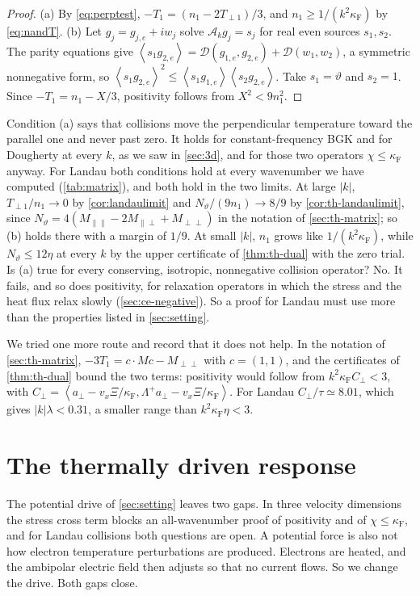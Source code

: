 \documentclass[11pt]{article}
\newcommand{\av}[1]{\left\langle #1\right\rangle}
\newcommand{\D}{\mathcal D}
\newcommand{\A}{\mathcal A}
\newcommand{\F}{\kappa_{\mathrm F}}
\newcommand{\dual}[1]{\left\langle #1,\Lambda^+ #1\right\rangle}
\theoremstyle{definition}
\theoremstyle{remark}
\numberwithin{equation}{section}
\begin{document}
\begin{proof}
(a) By \eqref{eq:perptest}, $-T_1=(n_1-2T_{\perp1})/3$, and
$n_1\geq1/(k^2\F)$ by \eqref{eq:nandT}. (b) Let $g_j=g_{j,e}+iw_j$ solve
$\A_kg_j=s_j$ for real even sources $s_1,s_2$. The parity equations give
$\av{s_1g_{2,e}}=\D(g_{1,e},g_{2,e})+\D(w_1,w_2)$, a symmetric nonnegative
form, so $\av{s_1g_{2,e}}^2\leq\av{s_1g_{1,e}}\av{s_2g_{2,e}}$. Take
$s_1=\vartheta$ and $s_2=1$. Since $-T_1=n_1-X/3$, positivity follows from
$X^2<9n_1^2$.
\end{proof}

Condition (a) says that collisions move the perpendicular temperature
toward the parallel one and never past zero. It holds for
constant-frequency BGK and for Dougherty at every $k$, as we saw in
\cref{sec:3d}, and for those two operators $\chi\leq\F$ anyway. For Landau
both conditions hold at every wavenumber we have computed
(\cref{tab:matrix}), and both hold in the two limits. At large $|k|$,
$T_{\perp1}/n_1\to0$ by \cref{cor:landaulimit} and
$N_\vartheta/(9n_1)\to8/9$ by \cref{cor:th-landaulimit}, since
$N_\vartheta=4(M_{\parallel\parallel}-2M_{\parallel\perp}+M_{\perp\perp})$
in the notation of \cref{sec:th-matrix}; so (b) holds there with a margin
of $1/9$. At small $|k|$, $n_1$ grows like $1/(k^2\F)$, while
$N_\vartheta\leq12\eta$ at every $k$ by the upper certificate of
\cref{thm:th-dual} with the zero trial. Is (a) true for every
conserving, isotropic, nonnegative collision operator? No. It fails,
and so does positivity, for relaxation operators in which the stress and
the heat flux relax slowly (\cref{sec:ce-negative}). So a proof for
Landau must use more than the properties listed in \cref{sec:setting}.

We tried one more route and record that it does not help. In the
notation of \cref{sec:th-matrix}, $-3T_1=c\cdot Mc-M_{\perp\perp}$ with
$c=(1,1)$, and the certificates of \cref{thm:th-dual} bound the two
terms: positivity would follow from $k^2\F C_\perp<3$, with
$C_\perp=\dual{a_\perp-v_x\Xi/\F}$. For Landau $C_\perp/\tau\simeq8.01$,
which gives $|k|\lambda<0.31$, a smaller range than $k^2\F\eta<3$.

\section{The thermally driven response}\label{sec:th-thermal}

The potential drive of \cref{sec:setting} leaves two gaps. In three
velocity dimensions the stress cross term blocks an all-wavenumber proof
of positivity and of $\chi\leq\F$, and for Landau collisions both
questions are open. A potential force is also not how electron
temperature perturbations are produced. Electrons are heated, and the
ambipolar electric field then adjusts so that no current flows. So we
change the drive. Both gaps close.
\end{document}
